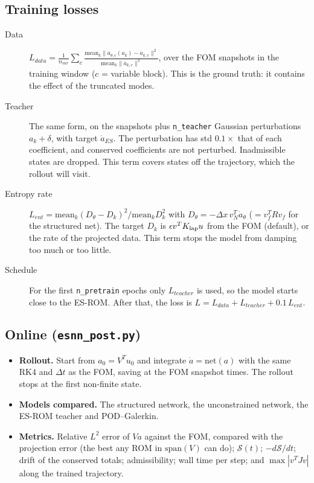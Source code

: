 \documentclass[11pt,a4paper]{article}
\newcommand{\code}[1]{\texttt{\small #1}}
\newcommand{\Sc}{\mathcal S}
\begin{document}
\subsection{Training losses}\label{sec:losses}
\begin{description}
\item[Data] $\displaystyle L_{data}=\frac1{n_{var}}\sum_c\frac{\mathrm{mean}_k\|\dot a_{\theta,c}(a_k)-\dot a_{k,c}\|^2}{\mathrm{mean}_k\|\dot a_{k,c}\|^2}$, over the FOM snapshots in the training window ($c$ = variable block). This is the ground truth: it contains the effect of the truncated modes.
\item[Teacher] The same form, on the snapshots plus \code{n\_teacher} Gaussian perturbations $a_k+\delta$, with target $\dot a_{ES}$. The perturbation has std $0.1\times$ that of each coefficient, and conserved coefficients are not perturbed. Inadmissible states are dropped. This term covers states off the trajectory, which the rollout will visit.
\item[Entropy rate] $L_{ent}=\mathrm{mean}_k(D_\theta-D_k)^2/\mathrm{mean}_kD_k^2$ with $D_\theta=-\Delta x\,v_N^T\dot a_\theta$ ($=v_f^TRv_f$ for the structured net). The target $D_k$ is $\epsilon v^TK_{\rm lap}u$ from the FOM (default), or the rate of the projected data. This term stops the model from damping too much or too little.
\item[Schedule] For the first \code{n\_pretrain} epochs only $L_{teacher}$ is used, so the model starts close to the ES-ROM. After that, the loss is $L=L_{data}+L_{teacher}+0.1\,L_{ent}$.
\end{description}

\subsection{Online (\code{esnn\_post.py})}
\begin{itemize}
\item \textbf{Rollout.} Start from $a_0=V^Tu_0$ and integrate $\dot a=\mathrm{net}(a)$ with the same RK4 and $\Delta t$ as the FOM, saving at the FOM snapshot times. The rollout stops at the first non-finite state.
\item \textbf{Models compared.} The structured network, the unconstrained network, the ES-ROM teacher and POD--Galerkin.
\item \textbf{Metrics.} Relative $L^2$ error of $Va$ against the FOM, compared with the projection error (the best any ROM in $\mathrm{span}(V)$ can do); $\Sc(t)$; $-d\Sc/dt$; drift of the conserved totals; admissibility; wall time per step; and $\max|v^TJv|$ along the trained trajectory.
\end{itemize}
\end{document}
